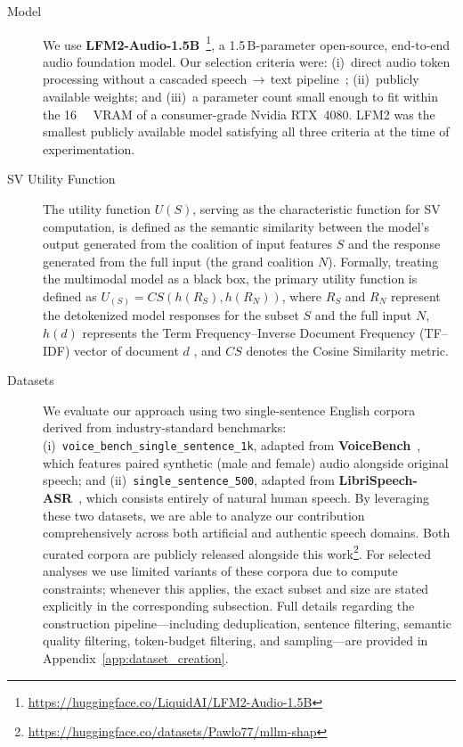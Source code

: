 \documentclass[cameraready]{Interspeech}
\begin{document}
\begin{description}
  \item[Model] We use \textbf{LFM2-Audio-1.5B}~\cite{LIQUID_LFM2_AUDIO_2025}\footnote{\url{https://huggingface.co/LiquidAI/LFM2-Audio-1.5B}}, a 1.5\,B-parameter open-source, end-to-end audio foundation model. Our selection criteria were: (i)~direct audio token processing without a cascaded speech$\,\to\,$text pipeline~\cite{yang2025largelanguagemodelsmeet, Lee_2022}; (ii)~publicly available weights; and (iii)~a parameter count small enough to fit within the \SI{16}{\giga\byte} VRAM of a consumer-grade Nvidia RTX~4080. LFM2 was the smallest publicly available model satisfying all three criteria at the time of experimentation.

  \item[SV Utility Function] The utility function $U(S)$, serving as the characteristic function for SV computation, is defined as the semantic similarity between the model's output generated from the coalition of input features $S$ and the response generated from the full input (the grand coalition $N$). Formally, treating the multimodal model as a black box, the primary utility function is defined as $U_(S) = CS(h(R_S), h(R_N))$, where $R_S$ and $R_N$ represent the detokenized model responses for the subset $S$ and the full input $N$, $h(d)$ represents the Term Frequency--Inverse Document Frequency (TF--IDF) vector of document $d$ \cite{salton1975vector, goldshmidt2024tokenshapinterpretinglargelanguage}, and $CS$ denotes the Cosine Similarity metric.

  \item[Datasets] We evaluate our approach using two single-sentence English corpora derived from industry-standard benchmarks: (i)~\texttt{voice\_bench\_single\_sentence\_1k}, adapted from \textbf{VoiceBench}~\cite{chen2024voicebench}, which features paired synthetic (male and female) audio alongside original speech; and (ii)~\texttt{single\_sentence\_500}, adapted from \textbf{LibriSpeech-ASR}~\cite{panayotov2015librispeech}, which consists entirely of natural human speech. By leveraging these two datasets, we are able to analyze our contribution comprehensively across both artificial and authentic speech domains. Both curated corpora are publicly released alongside this work\footnote{\url{https://huggingface.co/datasets/Pawlo77/mllm-shap}}. For selected analyses we use limited variants of these corpora due to compute constraints; whenever this applies, the exact subset and size are stated explicitly in the corresponding subsection. Full details regarding the construction pipeline---including deduplication, sentence filtering, semantic quality filtering, token-budget filtering, and sampling---are provided in Appendix~\ref{app:dataset_creation}. 


\end{description}
\end{document}
